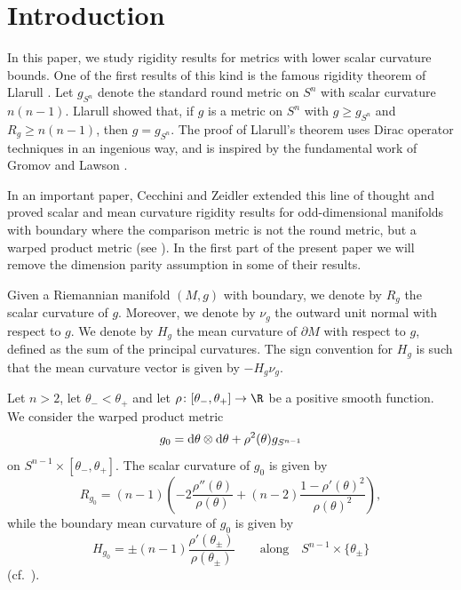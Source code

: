 \section{Introduction}

In this paper, we study rigidity results for metrics with lower scalar curvature bounds.
One of the first results of this kind is the famous rigidity theorem of Llarull \cite{Llarull}.
Let $g_{S^n}$ denote the standard round metric on $S^n$ with scalar curvature $n(n-1)$. Llarull showed that, if $g$ is a metric on $S^n$ with $g \geq g_{S^n}$ and $R_g \geq n(n-1)$, then $g=g_{S^n}$.
The proof of Llarull's theorem uses Dirac operator techniques in an ingenious way, and is inspired by the fundamental work of Gromov and Lawson \cite{Gromov-Lawson1, Gromov-Lawson2}.

In an important paper, Cecchini and Zeidler extended this line of thought and proved scalar and mean curvature rigidity results for odd-dimensional manifolds with boundary where the comparison metric is not the round metric, but a warped product metric (see \cite[Section~10]{Cecchini-Zeidler}).
In the first part of the present paper we will remove the dimension parity assumption in some of their results.

Given a Riemannian manifold $(M,g)$ with boundary, we denote by $R_g$ the scalar curvature of $g$. Moreover, we denote by $\nu_g$ the outward unit normal with respect to $g$.
We denote by $H_g$ the mean curvature of $\partial M$ with respect to $g$, defined as the sum of the principal curvatures.
The sign convention for $H_g$ is such that the mean curvature vector is given by $-H_g\nu_g$.

Let $n>2$, let $\theta_- < \theta_+$ and let $\rho\colon [\theta_- , \theta_+] \to \R$ be a positive smooth function.
We consider the warped product metric
\begin{equation} \label{g_0}
 g_0 = {\rm d}\theta \otimes {\rm d}\theta + \rho^2(\theta) g_{S^{n-1}}
\end{equation}
on $S^{n-1} \times [\theta_- , \theta_+]$. The scalar curvature of $g_0$ is given by
\begin{equation} \label{scal_g_0}
 R_{g_0} = (n-1) \left( -2 \frac{\rho''(\theta)}{\rho(\theta)} + (n-2) \frac{1- \rho'(\theta)^2}{\rho(\theta)^2} \right),
\end{equation}
while the boundary mean curvature of $g_0$ is given by
\begin{equation} \label{mean_g_0}
 H_{g_0} = \pm (n-1) \frac{\rho'(\theta_{\pm})}{\rho(\theta_{\pm})}\qquad \text{along}\quad S^{n-1} \times \{ \theta_{\pm} \}
\end{equation}
(cf.\ \cite[Example~4.1]{Baer-Gauduchon-Moroianu}).

